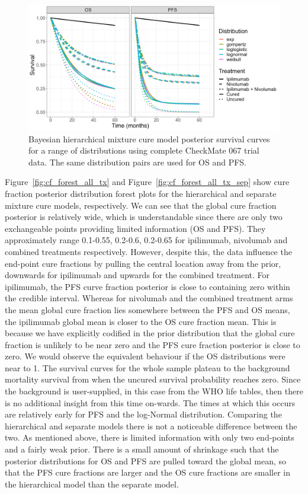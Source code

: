 \documentclass[AMA,STIX1COL]{WileyNJD-v2}
\begin{document}
\begin{figure}[!ht]
\centering
\includegraphics[width=0.7\linewidth]{plot_S_overlay.png}
\caption{\label{fig:S_overlay} Bayesian hierarchical mixture cure model posterior survival curves for a range of distributions using complete CheckMate 067 trial data. The same distribution pairs are used for OS and PFS.}
\end{figure}

Figure~\ref{fig:cf_forest_all_tx} and Figure~\ref{fig:cf_forest_all_tx_sep} show cure fraction posterior distribution forest plots for the hierarchical and separate mixture cure models, respectively. 
We can see that the global cure fraction posterior is relatively wide, which is understandable since there are only two exchangeable points providing limited information (OS and PFS).
They approximately range 0.1-0.55, 0.2-0.6, 0.2-0.65 for ipilimumab, nivolumab and combined treatments respectively. 
However, despite this, the data influence the end-point cure fractions by pulling the central location away from the prior, downwards for ipilimumab and upwards for the combined treatment.
For ipilimumab, the PFS curve fraction posterior is close to containing zero within the credible interval.
Whereas for nivolumab and the combined treatment arms the mean global cure fraction lies somewhere between the PFS and OS means, the ipilimumab global mean is closer to the OS cure fraction mean. This is because we have explicitly codified in the prior distribution that the global cure fraction is unlikely to be near zero and the PFS cure fraction posterior is close to zero.
We would observe the equivalent behaviour if the OS distributions were near to 1.
The survival curves for the whole sample plateau to the background mortality survival from when the uncured survival probability reaches zero.
Since the background is user-supplied, in this case from the WHO life tables, then there is no additional insight from this time on-wards.
The times at which this occurs are relatively early for PFS and the log-Normal distribution.
Comparing the hierarchical and separate models there is not a noticeable difference between the two.
As mentioned above, there is limited information with only two end-points and a fairly weak prior.
There is a small amount of shrinkage such that the posterior distributions for OS and PFS are pulled toward the global mean, so that the PFS cure fractions are larger and the OS cure fractions are smaller in the hierarchical model than the separate model.
\end{document}
